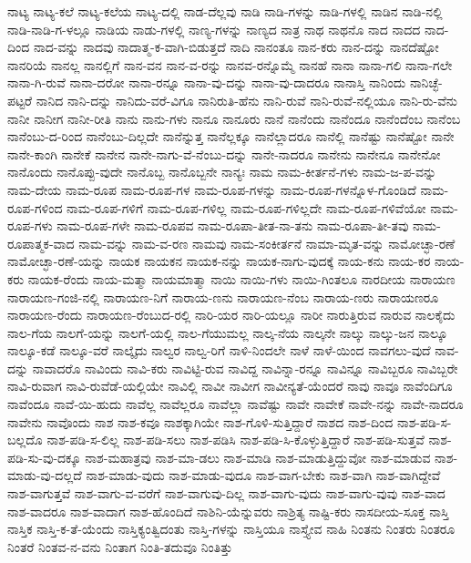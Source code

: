 {ನಾಟ್ಯ
ನಾಟ್ಯ-ಕಲೆ
ನಾಟ್ಯ-ಕಲೆಯ
ನಾಟ್ಯ-ದಲ್ಲಿ
ನಾಡ-ದೆಲ್ಲವು
ನಾಡಿ
ನಾಡಿ-ಗಳನ್ನು
ನಾಡಿ-ಗಳಲ್ಲಿ
ನಾಡಿನ
ನಾಡಿ-ನಲ್ಲಿ
ನಾಡಿ-ನಾಡಿ-ಗ-ಳಲ್ಲೂ
ನಾಡಿಯ
ನಾಡು-ಗಳಲ್ಲಿ
ನಾಣ್ಯ-ಗಳನ್ನು
ನಾಣ್ಯದ
ನಾತ್ರ
ನಾಥ
ನಾಥನೊ
ನಾದ
ನಾದದ
ನಾದ-ದಿಂದ
ನಾದ-ವನ್ನು
ನಾದವು
ನಾದಾತ್ಮ-ಕ-ವಾಗಿ-ಬಿಡುತ್ತದೆ
ನಾದಿ
ನಾನಂತೂ
ನಾನ-ಕರು
ನಾನ-ದನ್ನು
ನಾನದೆಷ್ಟೋ
ನಾನರಿಯೆ
ನಾನಲ್ಲ
ನಾನಲ್ಲಿಗೆ
ನಾನ-ವನ
ನಾನ-ವ-ರನ್ನು
ನಾನವ-ರನ್ನೊಮ್ಮೆ
ನಾನಹೆ
ನಾನಾ
ನಾನಾ-ಗಲಿ
ನಾನಾ-ಗಲೇ
ನಾನಾ-ಗಿ-ರುವೆ
ನಾನಾ-ದರೋ
ನಾನಾ-ರನ್ನೂ
ನಾನಾ-ವು-ದನ್ನು
ನಾನಾ-ವು-ದಾದರೂ
ನಾನಾಸ್ತಿ
ನಾನಿಂದು
ನಾನಿಚ್ಛೆ-ಪಟ್ಟರೆ
ನಾನಿದ
ನಾನಿ-ದನ್ನು
ನಾನಿದು-ವರೆ-ವಿಗೂ
ನಾನಿರುತಿ-ಹೆನು
ನಾನಿ-ರುವೆ
ನಾನಿ-ರುವೆ-ನಲ್ಲಿಯೂ
ನಾನಿ-ರು-ವೆನು
ನಾನೀ
ನಾನೀಗ
ನಾನೀ-ರೀತಿ
ನಾನು
ನಾನು-ಗಳು
ನಾನೂ
ನಾನೂರು
ನಾನೆ
ನಾನೆಂದು
ನಾನೆಂದೂ
ನಾನೆಂದೆಂಬ
ನಾನೆಂಬ
ನಾನೆಂಬು-ದ-ರಿಂದ
ನಾನೆಂಬು-ದಿಲ್ಲದೇ
ನಾನೆನ್ನುತ್ತ
ನಾನೆಲ್ಲಕ್ಕೂ
ನಾನೆಲ್ಲಾದರೂ
ನಾನೆಲ್ಲಿ
ನಾನೆಷ್ಟು
ನಾನೆಷ್ಟೋ
ನಾನೇ
ನಾನೇ-ಕಾಂಗಿ
ನಾನೇಕೆ
ನಾನೇನ
ನಾನೇ-ನಾಗು-ವೆ-ನೆಂಬು-ದನ್ನು
ನಾನೇ-ನಾದರೂ
ನಾನೇನು
ನಾನೇನೂ
ನಾನೇನೋ
ನಾನೊಂದು
ನಾನೊಪ್ಪು-ವುದೇ
ನಾನೊಬ್ಬ
ನಾನೊಬ್ಬನೇ
ನಾನ್ಯಃ
ನಾಮ
ನಾಮ-ಕೀರ್ತನೆ-ಗಳು
ನಾಮ-ಜ-ಪ-ವನ್ನು
ನಾಮ-ದೇಯ
ನಾಮ-ರೂಪ
ನಾಮ-ರೂಪ-ಗಳ
ನಾಮ-ರೂಪ-ಗಳನ್ನು
ನಾಮ-ರೂಪ-ಗಳನ್ನೊಳ-ಗೊಂಡಿದೆ
ನಾಮ-ರೂಪ-ಗಳಿಂದ
ನಾಮ-ರೂಪ-ಗಳಿಗೆ
ನಾಮ-ರೂಪ-ಗಳಿಲ್ಲ
ನಾಮ-ರೂಪ-ಗಳಿಲ್ಲದೇ
ನಾಮ-ರೂಪ-ಗಳಿವೆಯೋ
ನಾಮ-ರೂಪ-ಗಳು
ನಾಮ-ರೂಪ-ಗಳೇ
ನಾಮ-ರೂಪವ
ನಾಮ-ರೂಪಾ-ತೀತ-ನಾ-ತನು
ನಾಮ-ರೂಪಾ-ತೀ-ತವು
ನಾಮ-ರೂಪಾತ್ಮಕ-ವಾದ
ನಾಮ-ವನ್ನು
ನಾಮ-ವ-ರಣ
ನಾಮವು
ನಾಮ-ಸಂಕೀರ್ತನೆ
ನಾಮಾ-ಮೃತ-ವನ್ನು
ನಾಮೋಚ್ಛಾ-ರಣೆ
ನಾಮೋಚ್ಛಾ-ರಣೆ-ಯನ್ನು
ನಾಯಕ
ನಾಯಕನ
ನಾಯಕ-ನನ್ನು
ನಾಯಕ-ನಾಗು-ವುದಕ್ಕೆ
ನಾಯ-ಕನು
ನಾಯ-ಕರ
ನಾಯ-ಕರು
ನಾಯಕ-ರೆಂದು
ನಾಯ-ಮತ್ಮಾ
ನಾಯಮಾತ್ಮಾ
ನಾಯಿ
ನಾಯಿ-ಗಳು
ನಾಯಿ-ಗಿಂತಲೂ
ನಾರದೀಯ
ನಾರಾಯಣ
ನಾರಾಯಣ-ಗಂಜಿ-ನಲ್ಲಿ
ನಾರಾಯಣ-ನಿಗೆ
ನಾರಾಯ-ಣನು
ನಾರಾಯಣ-ನೆಂಬ
ನಾರಾಯ-ಣರು
ನಾರಾಯಣರೂ
ನಾರಾಯಣ-ರೆಂದು
ನಾರಾಯಣ-ರೆಂಬುದ-ರಲ್ಲಿ
ನಾರಿ-ಯರ
ನಾರಿ-ಯಲ್ಲೂ
ನಾರೀ
ನಾರುತ್ತಿರುವ
ನಾರುವ
ನಾಲಕೈದು
ನಾಲ-ಗೆಯ
ನಾಲಗೆ-ಯನ್ನು
ನಾಲಗೆ-ಯಲ್ಲಿ
ನಾಲ-ಗೆಯುಮಲ್ಲ
ನಾಲ್ಕ-ನೆಯ
ನಾಲ್ಕನೇ
ನಾಲ್ಕು
ನಾಲ್ಕು-ಜನ
ನಾಲ್ಕೂ
ನಾಲ್ಕೂ-ಕಡೆ
ನಾಲ್ಕೂ-ವರೆ
ನಾಲ್ಕೈದು
ನಾಲ್ವರ
ನಾಲ್ವ-ರಿಗೆ
ನಾಳಿ-ನಿಂದಲೇ
ನಾಳೆ
ನಾಳೆ-ಯಿಂದ
ನಾವಗಲು-ವುದೆ
ನಾವ-ದನ್ನು
ನಾವಾದರೊ
ನಾವಿಂದು
ನಾವಿ-ಕರು
ನಾವಿಟ್ಟಿ-ರುವ
ನಾವಿದ್ದ
ನಾವಿನ್ನಾ-ರನ್ನೂ
ನಾವಿನ್ನೂ
ನಾವಿಬ್ಬರೂ
ನಾವಿಬ್ಬರೇ
ನಾವಿ-ರುವಾಗ
ನಾವಿ-ರುವೆಡೆ-ಯಲ್ಲಿಯೇ
ನಾವಿಲ್ಲಿ
ನಾವೀ
ನಾವೀಗ
ನಾವೀನ್ಯತೆ-ಯೆಂದರೆ
ನಾವು
ನಾವೂ
ನಾವೆಂದಿಗೂ
ನಾವೆಂದೂ
ನಾವೆ-ಯಿ-ಹುದು
ನಾವೆಲ್ಲ
ನಾವೆಲ್ಲರೂ
ನಾವೆಲ್ಲಾ
ನಾವೆಷ್ಟು
ನಾವೇ
ನಾವೇಕೆ
ನಾವೇ-ನನ್ನು
ನಾವೇ-ನಾದರೂ
ನಾವೇನು
ನಾವೊಂದು
ನಾಶ
ನಾಶ-ಕವೂ
ನಾಶಕ್ಕಾಗಿಯೇ
ನಾಶ-ಗೊಳಿ-ಸುತ್ತಿದ್ದಾರೆ
ನಾಶದ
ನಾಶ-ದಿಂದ
ನಾಶ-ಪಡಿ-ಸ-ಬಲ್ಲದೊ
ನಾಶ-ಪಡಿ-ಸ-ಲಿಲ್ಲ
ನಾಶ-ಪಡಿ-ಸಲು
ನಾಶ-ಪಡಿಸಿ
ನಾಶ-ಪಡಿ-ಸಿ-ಕೊಳ್ಳುತ್ತಿದ್ದಾರೆ
ನಾಶ-ಪಡಿ-ಸುತ್ತವೆ
ನಾಶ-ಪಡಿ-ಸು-ವು-ದಕ್ಕೂ
ನಾಶ-ಮಹಾತ್ರವು
ನಾಶ-ಮಾ-ಡಲು
ನಾಶ-ಮಾಡಿ
ನಾಶ-ಮಾಡುತ್ತಿದ್ದುವೋ
ನಾಶ-ಮಾಡುವ
ನಾಶ-ಮಾಡು-ವು-ದಲ್ಲದೆ
ನಾಶ-ಮಾಡು-ವುದು
ನಾಶ-ಮಾಡು-ವುದೂ
ನಾಶ-ವಾಗ-ಬೇಕು
ನಾಶ-ವಾಗಿ
ನಾಶ-ವಾಗಿದ್ದೇವೆ
ನಾಶ-ವಾಗುತ್ತವೆ
ನಾಶ-ವಾಗು-ವ-ವರೆಗೆ
ನಾಶ-ವಾಗುವು-ದಿಲ್ಲ
ನಾಶ-ವಾಗು-ವುದು
ನಾಶ-ವಾಗು-ವುವು
ನಾಶ-ವಾದ
ನಾಶ-ವಾದರೂ
ನಾಶ-ವಾದಾಗ
ನಾಶ-ಹೊಂದಿದೆ
ನಾಶಿನಿ-ಯೆನ್ನುವರು
ನಾಶ್ರಿತ್ಯ
ನಾಷ್ಟಿ-ಕರು
ನಾಸದೀಯ-ಸೂಕ್ತ
ನಾಸ್ತಿ
ನಾಸ್ತಿಕ
ನಾಸ್ತಿ-ಕ-ತೆ-ಯೆಂದು
ನಾಸ್ತಿಕ್ಯಂತ್ವಿದಂತು
ನಾಸ್ತಿ-ಗಳನ್ನು
ನಾಸ್ತಿಯೂ
ನಾಸ್ತ್ಯೇವ
ನಾಹಿ
ನಿಂತನು
ನಿಂತರು
ನಿಂತರೂ
ನಿಂತರೆ
ನಿಂತವ-ನ-ವನು
ನಿಂತಾಗ
ನಿಂತಿ-ತದುವೂ
ನಿಂತಿತ್ತು
}
